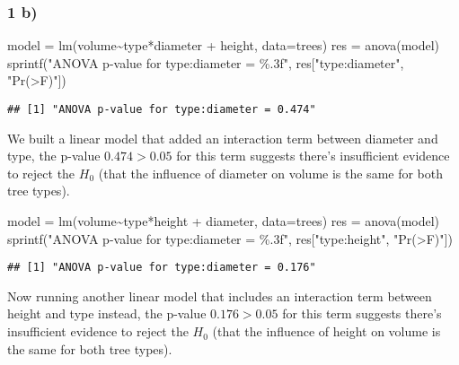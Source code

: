 \documentclass[
  11pt,
]{article}
\newenvironment{Shaded}{\begin{snugshade}}{\end{snugshade}}
\newcommand{\AttributeTok}[1]{\textcolor[rgb]{0.77,0.63,0.00}{#1}}
\newcommand{\FunctionTok}[1]{\textcolor[rgb]{0.00,0.00,0.00}{#1}}
\newcommand{\NormalTok}[1]{#1}
\newcommand{\OtherTok}[1]{\textcolor[rgb]{0.56,0.35,0.01}{#1}}
\newcommand{\SpecialCharTok}[1]{\textcolor[rgb]{0.00,0.00,0.00}{#1}}
\newcommand{\StringTok}[1]{\textcolor[rgb]{0.31,0.60,0.02}{#1}}
\begin{document}
\hypertarget{b}{%
\subsubsection{1 b)}\label{b}}

\begin{Shaded}
\begin{Highlighting}[]
\NormalTok{model }\OtherTok{=} \FunctionTok{lm}\NormalTok{(volume}\SpecialCharTok{\textasciitilde{}}\NormalTok{type}\SpecialCharTok{*}\NormalTok{diameter }\SpecialCharTok{+}\NormalTok{ height, }\AttributeTok{data=}\NormalTok{trees)}
\NormalTok{res }\OtherTok{=} \FunctionTok{anova}\NormalTok{(model)}
\FunctionTok{sprintf}\NormalTok{(}\StringTok{"ANOVA p{-}value for type:diameter = \%.3f"}\NormalTok{, res[}\StringTok{"type:diameter"}\NormalTok{, }\StringTok{"Pr(\textgreater{}F)"}\NormalTok{])}
\end{Highlighting}
\end{Shaded}

\begin{verbatim}
## [1] "ANOVA p-value for type:diameter = 0.474"
\end{verbatim}

We built a linear model that added an interaction term between diameter
and type, the p-value \(0.474>0.05\) for this term suggests there's
insufficient evidence to reject the \(H_0\) (that the influence of
diameter on volume is the same for both tree types).

\begin{Shaded}
\begin{Highlighting}[]
\NormalTok{model }\OtherTok{=} \FunctionTok{lm}\NormalTok{(volume}\SpecialCharTok{\textasciitilde{}}\NormalTok{type}\SpecialCharTok{*}\NormalTok{height }\SpecialCharTok{+}\NormalTok{ diameter, }\AttributeTok{data=}\NormalTok{trees)}
\NormalTok{res }\OtherTok{=} \FunctionTok{anova}\NormalTok{(model)}
\FunctionTok{sprintf}\NormalTok{(}\StringTok{"ANOVA p{-}value for type:diameter = \%.3f"}\NormalTok{, res[}\StringTok{"type:height"}\NormalTok{, }\StringTok{"Pr(\textgreater{}F)"}\NormalTok{])}
\end{Highlighting}
\end{Shaded}

\begin{verbatim}
## [1] "ANOVA p-value for type:diameter = 0.176"
\end{verbatim}

Now running another linear model that includes an interaction term
between height and type instead, the p-value \(0.176>0.05\) for this
term suggests there's insufficient evidence to reject the \(H_0\) (that
the influence of height on volume is the same for both tree types).
\end{document}

